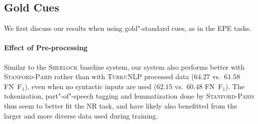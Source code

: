 \documentclass[11pt,a4paper]{article}
\theoremstyle{plain}
\def\fscore{F$_1$}
\begin{document}
\subsection{Gold Cues}
We first discuss our results when using gold"-standard cues, as in the EPE
tasks.

\paragraph{Effect of Pre-processing}

Similar to the \textsc{Sherlock} baseline system, our system also
performs better with \textsc{Stanford-Paris} rather than with \textsc{TurkuNLP}
processed data ($64.27$ vs.\ $61.58$ FN~\fscore), even when no syntactic inputs
are used ($62.15$ vs.\ $60.48$ FN~\fscore).
The tokenization, part"-of"-speech tagging and lemmatization done by
\textsc{Stanford-Paris} thus seem to better fit the NR task, and have likely
also benefitted from the larger and more diverse data used during training.
\end{document}
